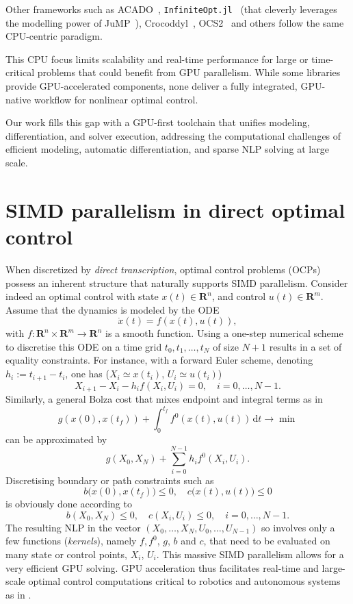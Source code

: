 Other frameworks such as ACADO~\cite{houska2011acado}, 
\texttt{InfiniteOpt.jl}~\cite{pulsipher2022unifying} (that cleverly leverages 
the modelling power of JuMP~\cite{dunning2017jump}),
Crocoddyl~\cite{mastalli2020crocoddyl}, OCS2~\cite{OCS2} and others
follow the same CPU-centric paradigm.

This CPU focus limits scalability and real-time performance for large or time-critical problems that could benefit from GPU parallelism.
While some libraries provide GPU-accelerated components, none deliver a fully integrated, GPU-native workflow for nonlinear optimal control.

Our work fills this gap with a GPU-first toolchain that unifies modeling, differentiation, and solver execution, addressing the computational challenges of efficient modeling, automatic differentiation, and sparse NLP solving at large scale.

\section{SIMD parallelism in direct optimal control}
When discretized by \emph{direct transcription}, optimal control problems (OCPs) possess an inherent structure that naturally supports SIMD parallelism. 
Consider indeed an optimal control with state $x(t) \in \mathbf{R}^n$, and control $u(t) \in \mathbf{R}^m$. Assume that the dynamics is modeled by the ODE
$$ \dot{x}(t) = f(x(t), u(t)), $$
with $f : \mathbf{R}^n \times \mathbf{R}^m \to \mathbf{R}^n$ is a smooth function. Using a one-step numerical scheme to discretise this ODE on a time grid $t_0, t_1, \dots, t_N$ of size $N + 1$ results in a set of equality constraints. For instance, with a forward Euler scheme, denoting $h_i := t_{i+1} - t_i$, one has ($X_i \simeq x(t_i)$, $U_i \simeq u(t_i)$)
$$ X_{i+1} - X_i - h_i f(X_i, U_i) = 0,\quad i = 0, \dots, N-1. $$
Similarly, a general Bolza cost that mixes endpoint and integral terms as in
$$ g(x(0), x(t_f)) + \int_0^{t_f} f^0(x(t), u(t))\,\mathrm{d}t \to \min $$
can be approximated by
$$ g(X_0, X_N) + \sum_{i=0}^{N-1} h_i f^0(X_i, U_i). $$
Discretising boundary or path constraints such as
$$ b\big(x(0),x(t_f)\big) \leq 0,\quad c\big(x(t), u(t)\big) \leq 0 $$
is obviously done according to
$$ b(X_0, X_N) \leq 0, \quad c(X_i, U_i) \leq 0,\quad i = 0, \dots, N-1. $$
The resulting NLP in the vector $(X_0,\dots,X_N,U_0,\dots,U_{N-1})$
so involves only a few functions (\emph{kernels}), namely $f, f^0$, $g$, $b$ and $c$, that need to be evaluated on many state or control points, $X_i$, $U_i$.
This massive SIMD parallelism allows for a very efficient GPU solving. GPU acceleration thus facilitates real-time and large-scale optimal control computations critical to robotics and autonomous systems as in \cite{pacaud2024gpu}.

